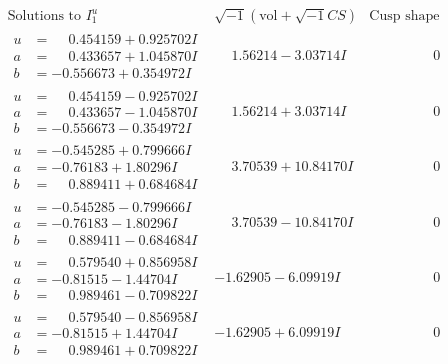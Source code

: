 \documentclass[1p]{elsarticle_modified}
\theoremstyle{definition}
\newcommand{\I}{\sqrt{-1}}
\begin{document}
$$\begin{array}{c|c|c}  
\text{Solutions to }I^u_{1}& \I (\text{vol} + \sqrt{-1}CS) & \text{Cusp shape}\\
 \hline 
\begin{aligned}
u &= \phantom{-}0.454159 + 0.925702 I \\
a &= \phantom{-}0.433657 + 1.045870 I \\
b &= -0.556673 + 0.354972 I\end{aligned}
 & \phantom{-}1.56214 - 3.03714 I & \phantom{-0.000000 } 0 \\ \hline\begin{aligned}
u &= \phantom{-}0.454159 - 0.925702 I \\
a &= \phantom{-}0.433657 - 1.045870 I \\
b &= -0.556673 - 0.354972 I\end{aligned}
 & \phantom{-}1.56214 + 3.03714 I & \phantom{-0.000000 } 0 \\ \hline\begin{aligned}
u &= -0.545285 + 0.799666 I \\
a &= -0.76183 + 1.80296 I \\
b &= \phantom{-}0.889411 + 0.684684 I\end{aligned}
 & \phantom{-}3.70539 + 10.84170 I & \phantom{-0.000000 } 0 \\ \hline\begin{aligned}
u &= -0.545285 - 0.799666 I \\
a &= -0.76183 - 1.80296 I \\
b &= \phantom{-}0.889411 - 0.684684 I\end{aligned}
 & \phantom{-}3.70539 - 10.84170 I & \phantom{-0.000000 } 0 \\ \hline\begin{aligned}
u &= \phantom{-}0.579540 + 0.856958 I \\
a &= -0.81515 - 1.44704 I \\
b &= \phantom{-}0.989461 - 0.709822 I\end{aligned}
 & -1.62905 - 6.09919 I & \phantom{-0.000000 } 0 \\ \hline\begin{aligned}
u &= \phantom{-}0.579540 - 0.856958 I \\
a &= -0.81515 + 1.44704 I \\
b &= \phantom{-}0.989461 + 0.709822 I\end{aligned}
 & -1.62905 + 6.09919 I & \phantom{-0.000000 } 0 \\ \hline\begin{aligned}

\end{aligned}
\end{array}$$
\end{document}
